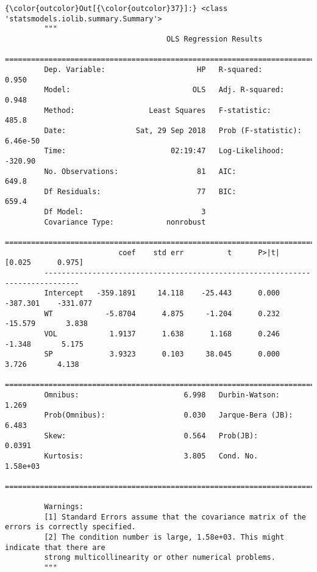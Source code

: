 \documentclass[11pt]{article}
\begin{document}
\begin{Verbatim}[commandchars=\\\{\}]
{\color{outcolor}Out[{\color{outcolor}37}]:} <class 'statsmodels.iolib.summary.Summary'>
         """
                                     OLS Regression Results                            
         ==============================================================================
         Dep. Variable:                     HP   R-squared:                       0.950
         Model:                            OLS   Adj. R-squared:                  0.948
         Method:                 Least Squares   F-statistic:                     485.8
         Date:                Sat, 29 Sep 2018   Prob (F-statistic):           6.46e-50
         Time:                        02:19:47   Log-Likelihood:                -320.90
         No. Observations:                  81   AIC:                             649.8
         Df Residuals:                      77   BIC:                             659.4
         Df Model:                           3                                         
         Covariance Type:            nonrobust                                         
         ==============================================================================
                          coef    std err          t      P>|t|      [0.025      0.975]
         ------------------------------------------------------------------------------
         Intercept   -359.1891     14.118    -25.443      0.000    -387.301    -331.077
         WT            -5.8704      4.875     -1.204      0.232     -15.579       3.838
         VOL            1.9137      1.638      1.168      0.246      -1.348       5.175
         SP             3.9323      0.103     38.045      0.000       3.726       4.138
         ==============================================================================
         Omnibus:                        6.998   Durbin-Watson:                   1.269
         Prob(Omnibus):                  0.030   Jarque-Bera (JB):                6.483
         Skew:                           0.564   Prob(JB):                       0.0391
         Kurtosis:                       3.805   Cond. No.                     1.58e+03
         ==============================================================================
         
         Warnings:
         [1] Standard Errors assume that the covariance matrix of the errors is correctly specified.
         [2] The condition number is large, 1.58e+03. This might indicate that there are
         strong multicollinearity or other numerical problems.
         """
\end{Verbatim}
            
\end{document}
